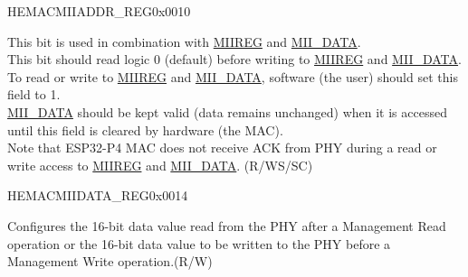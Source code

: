 \begin{register}{H}{EMACMIIADDR\_REG}{0x0010}
\begin{regdesc}
\begin{reglist}
This bit is used in combination with \hyperref[fielddesc:MIIREG]{MIIREG} and \hyperref[regdesc:EMACMIIDATAREG]{MII\_DATA}.\\
This bit should read logic 0 (default) before writing to \hyperref[fielddesc:MIIREG]{MIIREG} and \hyperref[regdesc:EMACMIIDATAREG]{MII\_DATA}.\\
To read or write to \hyperref[fielddesc:MIIREG]{MIIREG} and \hyperref[regdesc:EMACMIIDATAREG]{MII\_DATA}, software (the user) should set this field to 1.\\
\hyperref[regdesc:EMACMIIDATAREG]{MII\_DATA} should be kept valid (data remains unchanged) when it is accessed until this field is cleared by hardware (the MAC).\\
Note that ESP32-P4 MAC does not receive ACK from PHY during a read or write access to \hyperref[fielddesc:MIIREG]{MIIREG} and \hyperref[regdesc:EMACMIIDATAREG]{MII\_DATA}. (R/WS/SC)
\end{reglist}\end{regdesc}
\end{register}


\begin{register}{H}{EMACMIIDATA\_REG}{0x0014}\label{regdesc:EMACMIIDATAREG}
%
%
\regnewline%
\begin{regdesc}\begin{reglist}
\item [MII\_DATA] Configures the 16-bit data value read from the PHY after a Management Read operation or the 16-bit data value to be written to the PHY before a Management Write operation.(R/W)
\end{reglist}\end{regdesc}
\end{register}


